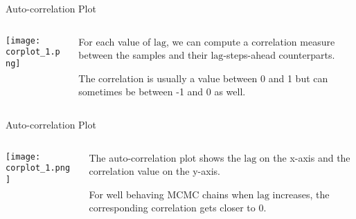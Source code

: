 \begin{frame}{Auto-correlation Plot}
    \begin{columns}
        \begin{column}{0.5\textwidth}
            \centering
            \texttt{[image: corplot\_1.png]}
        \end{column}
        \begin{column}{0.5\textwidth}
            \begin{vfilleditems}
                \item For each value of $\text{lag}$, we can compute a correlation measure between the samples and their $\text{lag}$-steps-ahead counterparts.
                \item The correlation is usually a value between 0 and 1 but can sometimes be between -1 and 0 as well.
            \end{vfilleditems}
        \end{column}
    \end{columns}
\end{frame}

\begin{frame}{Auto-correlation Plot}
    \begin{columns}
        \begin{column}{0.5\textwidth}
            \centering
            \texttt{[image: corplot\_1.png]}
        \end{column}
        \begin{column}{0.5\textwidth}
            \begin{vfilleditems}
                \item The auto-correlation plot shows the $\text{lag}$ on the x-axis and the correlation value on the y-axis.
                \item For well behaving MCMC chains when $\text{lag}$ increases, the corresponding correlation gets closer to 0.
            \end{vfilleditems}
        \end{column}
    \end{columns}
\end{frame}

